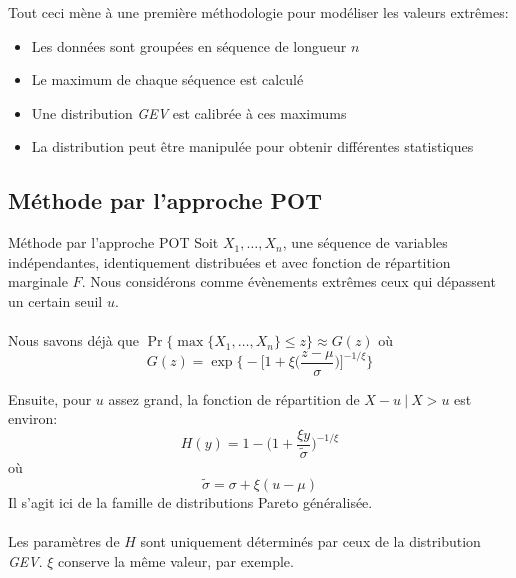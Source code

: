 \documentclass[aspectratio=169, 12pt, french]{beamer}
\begin{document}
\begin{frame}
Tout ceci mène à une première méthodologie pour modéliser les valeurs extrêmes:
\begin{itemize}
\item Les données sont groupées en séquence de longueur $n$
\item Le maximum de chaque séquence est calculé
\item Une distribution \textit{GEV} est calibrée à ces maximums
\item La distribution peut être manipulée pour obtenir différentes statistiques
\end{itemize}
\end{frame}


\subsection{Méthode par l'approche POT}
\begin{frame}{Méthode par l'approche POT}
Soit $X_1,\dots, X_n$, une séquence de variables indépendantes, identiquement distribuées et avec fonction de répartition marginale $F$. Nous considérons comme évènements extrêmes ceux qui dépassent un certain seuil $u$.\\~\\
Nous savons déjà que $\Pr\{ \max\{X_1,\dots,X_n\} \le z \}\approx G(z)$
où
\begin{equation*}
{G(z) = \exp \Bigg\{ - \Big[ 1 +\xi\Big(\frac{z-\mu}{\sigma}\Big) \Big]^{-1/\xi}  \Bigg\}}
\end{equation*}
\end{frame}

\begin{frame}
Ensuite, pour $u$ assez grand, la fonction de répartition de $X-u\ |\ X>u$ est environ:
\begin{equation}
H(y) = 1 - \Big(1+\frac{\xi y}{\tilde\sigma}\Big)^{-1/\xi}
\end{equation}
où
\begin{equation*}
{\tilde{\sigma} = \sigma + \xi(u-\mu)}
\end{equation*}
Il s'agit ici de la famille de distributions Pareto généralisée.\\~\\
Les paramètres de $H$ sont uniquement déterminés par ceux de la distribution \textit{GEV}. $\xi$ conserve la même valeur, par exemple.
\end{frame}
\end{document}
